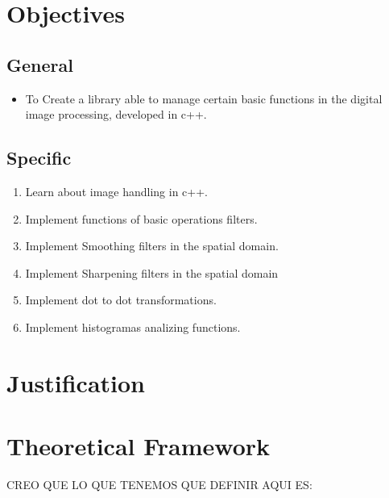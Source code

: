 \documentclass[a4paper]{article}
\begin{document}
\section{Objectives}
	\subsection{General}

		\begin{itemize}

		\item To Create a library able to manage certain basic functions in the digital image processing, developed in c++.

		\end{itemize}

	\subsection{Specific}

		\begin{enumerate}
     
        	\item{Learn about image handling in c++.}

			\item{Implement functions of basic operations filters.}

			\item{Implement Smoothing filters in the spatial domain.}
            
            \item{Implement Sharpening filters in the spatial domain}
            
            \item{Implement dot to dot transformations.}
            
            \item{Implement histogramas analizing functions.}

		\end{enumerate}
\section{Justification}

\section{Theoretical Framework}

CREO QUE LO QUE TENEMOS QUE DEFINIR AQUI ES:
\end{document}
